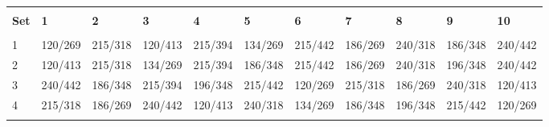 

\begin{center}
\begin{tabular}{l l l l l l l l l l l}
\toprule \\
\textbf{Set} &	\textbf{1} &	\textbf{2} &	\textbf{3} &	\textbf{4} &	\textbf{5} &	\textbf{6} &	\textbf{7} &	\textbf{8} &	\textbf{9} &	\textbf{10} \\
\midrule \\
1 &	120/269 &	215/318 &	120/413 &	215/394 &	134/269 &	215/442 &	186/269 &	240/318 &	186/348 &	240/442 \\
2 &	120/413 &	215/318 &	134/269 &	215/394 &	186/348 &	215/442 &	186/269 &	240/318 &	196/348 &	240/442 \\
3 &	240/442 &	186/348 &	215/394 &	196/348 &	215/442 &	120/269 &	215/318 &	186/269 &	240/318 &	120/413 \\
4 &	215/318 &	186/269 &	240/442 &	120/413 &	240/318 &	134/269 &	186/348 &	196/348 &	215/442 &	120/269 \\
\bottomrule \\
\end{tabular} 
\end{center}




